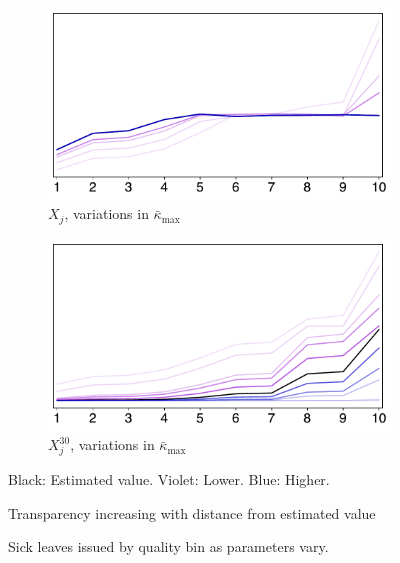 \documentclass[../main.tex]{subfiles}
\begin{document}
\begin{figure}[H]
    \begin{subfigure}[b]{0.39\linewidth}
        \centering
        \includegraphics[width=\linewidth]{k_id1.pdf}
        \vspace{-0.6cm}
        \caption{$X_j$, variations in $\bar{\kappa}_{\max}$}
        \label{fig:k1}
    \end{subfigure}
    \hspace{0.07\linewidth}  %
    \begin{subfigure}[b]{0.39\linewidth}
        \centering
        \includegraphics[width=\linewidth]{k_id2.pdf}
        \vspace{-0.6cm}
        \caption{$X_j^{30}$, variations in $\bar{\kappa}_{\max}$}
        \label{fig:k2}
    \end{subfigure}


\caption{Sick leaves issued by quality bin as parameters vary.}
\label{fig:identification}
\vspace{0.2em}
{\small Black: Estimated value. Violet: Lower. Blue: Higher.
\vspace{-0.2em}

Transparency increasing with distance from estimated value}


\end{figure}
\end{document}
